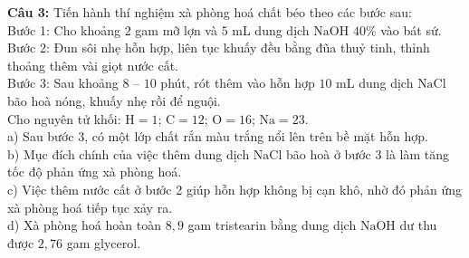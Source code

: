 \documentclass[12pt,a4paper]{article}
\begin{document}
\par\noindent\begin{minipage}{\linewidth}
\noindent \textbf{Câu 3:} Tiến hành thí nghiệm xà phòng hoá chất béo theo các bước sau:\\
Bước 1: Cho khoảng $2$ gam mỡ lợn và $5$ mL dung dịch $\text{NaOH}$ $40\%$ vào bát sứ.\\
Bước 2: Đun sôi nhẹ hỗn hợp, liên tục khuấy đều bằng đũa thuỷ tinh, thỉnh thoảng thêm vài giọt nước cất.\\
Bước 3: Sau khoảng $8$ -- $10$ phút, rót thêm vào hỗn hợp $10$ mL dung dịch $\text{NaCl}$ bão hoà nóng, khuấy nhẹ rồi để nguội.\\
Cho nguyên tử khối: $\text{H} = 1$; $\text{C} = 12$; $\text{O} = 16$; $\text{Na} = 23$.\\
\noindent a) Sau bước 3, có một lớp chất rắn màu trắng nổi lên trên bề mặt hỗn hợp.\\

\noindent b) Mục đích chính của việc thêm dung dịch $\text{NaCl}$ bão hoà ở bước 3 là làm tăng tốc độ phản ứng xà phòng hoá.\\

\noindent c) Việc thêm nước cất ở bước 2 giúp hỗn hợp không bị cạn khô, nhờ đó phản ứng xà phòng hoá tiếp tục xảy ra.\\

\noindent d) Xà phòng hoá hoàn toàn $8{,}9$ gam tristearin bằng dung dịch $\text{NaOH}$ dư thu được $2{,}76$ gam glycerol.\\
\end{minipage}\par\vspace{0.12cm}
\end{document}

